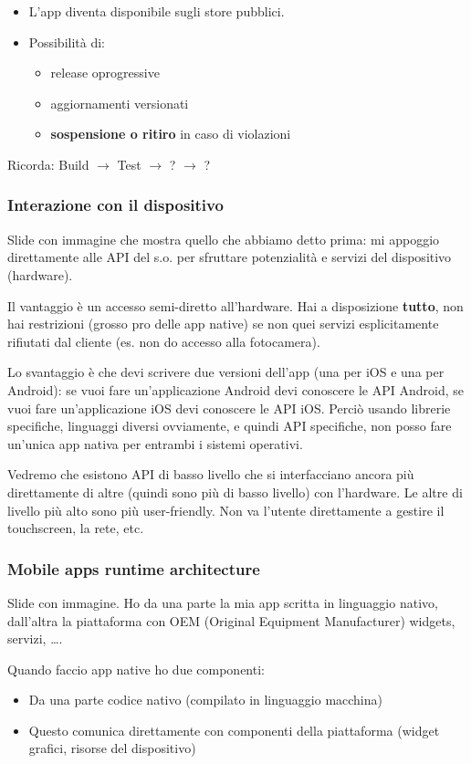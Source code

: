 \begin{enumerate}
\begin{itemize}
        \item L'app diventa disponibile sugli store pubblici.
        \item Possibilità di:
        \begin{itemize}
            \item release oprogressive
            \item aggiornamenti versionati
            \item \textbf{sospensione o ritiro} in caso di violazioni
        \end{itemize}
    \end{itemize}
    Ricorda: Build $\rightarrow$ Test $\rightarrow$ ? $\rightarrow$ ?
\end{enumerate}

\subsubsection{Interazione con il dispositivo}
\par Slide con immagine che mostra quello che abbiamo detto prima: mi appoggio direttamente alle API del s.o. per sfruttare potenzialità e servizi del dispositivo (hardware).
\par Il vantaggio è un accesso semi-diretto all'hardware. Hai a disposizione \textbf{tutto}, non hai restrizioni (grosso pro delle app native) se non quei servizi esplicitamente rifiutati dal cliente (es. non do accesso alla fotocamera).
\par Lo svantaggio è che devi scrivere due versioni dell'app (una per iOS e una per Android): se vuoi fare un'applicazione Android devi conoscere le API Android, se vuoi fare un'applicazione iOS devi conoscere le API iOS. Perciò usando librerie specifiche, linguaggi diversi ovviamente, e quindi API specifiche, non posso fare un'unica app nativa per entrambi i sistemi operativi.
\par Vedremo che esistono API di basso livello che si interfacciano ancora più direttamente di altre (quindi sono più di basso livello) con l'hardware. Le altre di livello più alto sono più user-friendly. Non va l'utente direttamente a gestire il touchscreen, la rete, etc. 

\subsubsection{Mobile apps runtime architecture}
\par Slide con immagine. Ho da una parte la mia app scritta in linguaggio nativo, dall'altra la piattaforma con OEM (Original Equipment Manufacturer) widgets, servizi, \dots.
\par Quando faccio app native ho due componenti:
\begin{itemize}
    \item Da una parte codice nativo (compilato in linguaggio macchina)
    \item Questo comunica direttamente con componenti della piattaforma (widget grafici, risorse del dispositivo)
\end{itemize}


